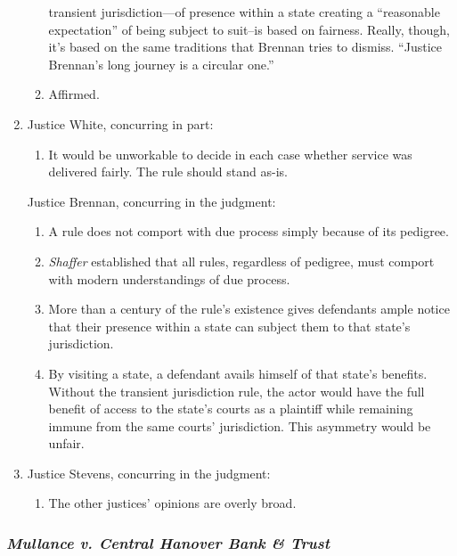 \begin{enumerate}
\begin{enumerate}
        transient jurisdiction---of presence within a state creating a 
        ``reasonable expectation'' of being subject to suit--is based on 
        fairness. Really, though, it's based on the same traditions that 
        Brennan tries to dismiss. ``Justice Brennan's long journey is a 
        circular one.''
        \item Affirmed.
    \end{enumerate}
    \item Justice White, concurring in part:
    \begin{enumerate}
        \item It would be unworkable to decide in each case whether service 
        was delivered fairly. The rule should stand as-is.
    \end{enumerate}
    Justice Brennan, concurring in the judgment:
    \begin{enumerate}
        \item A rule does not comport with due process simply because of its 
        pedigree.
        \item \emph{Shaffer} established that all rules, regardless of 
        pedigree, must comport with modern understandings of due process.
        \item More than a century of the rule's existence gives defendants 
        ample notice that their presence within a state can subject them to 
        that state's jurisdiction.
        \item By visiting a state, a defendant avails himself of that state's 
        benefits. Without the transient jurisdiction rule, the actor would 
        have the full benefit of access to the state's courts as a plaintiff 
        while remaining immune from the same courts' jurisdiction. This 
        asymmetry would be unfair.
    \end{enumerate}
    \item Justice Stevens, concurring in the judgment:
    \begin{enumerate}
        \item The other justices' opinions are overly broad.
    \end{enumerate}
\end{enumerate}

\subsubsection{\emph{Mullance v. Central Hanover Bank \& Trust}}

